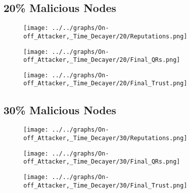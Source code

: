 \begin{minipage}[t]{0.49\columnwidth}
\subsection*{20\% Malicious Nodes}
    \begin{figure}[H]
        \centering
        \texttt{[image: ../../graphs/On-off\_Attacker,\_Time\_Decayer/20/Reputations.png]}
    \end{figure}
    \begin{figure}[H]
        \centering
        \texttt{[image: ../../graphs/On-off\_Attacker,\_Time\_Decayer/20/Final\_QRs.png]}
    \end{figure}
\end{minipage}
\begin{minipage}[t]{0.49\columnwidth}
    \begin{figure}[H]
        \centering
        \texttt{[image: ../../graphs/On-off\_Attacker,\_Time\_Decayer/20/Final\_Trust.png]}
    \end{figure}
\end{minipage}

\begin{minipage}[t]{0.49\columnwidth}
\subsection*{30\% Malicious Nodes}
    \begin{figure}[H]
        \centering
        \texttt{[image: ../../graphs/On-off\_Attacker,\_Time\_Decayer/30/Reputations.png]}
    \end{figure}
    \begin{figure}[H]
        \centering
        \texttt{[image: ../../graphs/On-off\_Attacker,\_Time\_Decayer/30/Final\_QRs.png]}
    \end{figure}
\end{minipage}
\begin{minipage}[t]{0.49\columnwidth}
    \begin{figure}[H]
        \centering
        \texttt{[image: ../../graphs/On-off\_Attacker,\_Time\_Decayer/30/Final\_Trust.png]}
    \end{figure}
\end{minipage}


